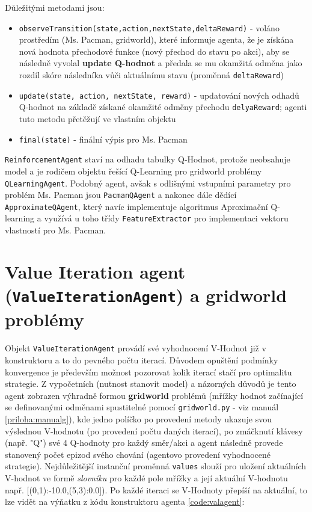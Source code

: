 Důležitými metodami jsou:
\begin{itemize}
\item \texttt{observeTransition(state,action,nextState,deltaReward)} - voláno prostředím (Ms. Pacman, gridworld), které informuje agenta, že je získána nová hodnota přechodové funkce (nový přechod do stavu po akci), aby se následně vyvolal \textbf{update Q-hodnot} a předala se mu okamžitá odměna jako rozdíl skóre následníka vůči aktuálnímu stavu (proměnná \texttt{deltaReward})
\item \texttt{update(state, action, nextState, reward)} - updatování nových odhadů Q-hodnot na základě získané okamžité odměny přechodu \texttt{delyaReward}; agenti tuto metodu přetěžují ve vlastním objektu
\item \texttt{final(state)} - finální výpis pro Ms. Pacman 
\end{itemize}
\texttt{ReinforcementAgent} staví na odhadu tabulky Q-Hodnot, protože neobsahuje model a je rodičem objektu řešící Q-Learning pro gridworld problémy \texttt{QLearningAgent}. Podobný agent, avšak s odlišnými vstupními parametry pro problém Ms. Pacman jsou \texttt{PacmanQAgent} a nakonec dále dědící \texttt{ApproximateQAgent}, který navíc implementuje algoritmus Aproximační Q-learning a využívá u toho třídy \texttt{FeatureExtractor} pro implementaci vektoru vlastností pro Ms. Pacman.
\newpage

\section{Value Iteration agent (\texttt{ValueIterationAgent}) a gridworld problémy}
Objekt \texttt{ValueIterationAgent} provádí své vyhodnocení V-Hodnot již v konstruktoru a to do pevného počtu iterací. Důvodem opuštění podmínky konvergence je především možnost pozorovat kolik iterací stačí pro optimalitu strategie. Z vypočetních (nutnost stanovit model) a názorných důvodů je tento agent zobrazen výhradně formou \textbf{gridworld} problémů (mřížky hodnot začínající se definovanými odměnami spustitelné pomocí \texttt{gridworld.py} - viz manuál \ref{priloha:manualg}), kde jedno políčko po provedení metody ukazuje svou výslednou V-hodnotu (po provedení počtu daných iterací), po zmáčknutí klávesy (např. "Q") své 4 Q-hodnoty pro každý směr/akci a agent následně provede stanovený počet epizod svého chování (agentovo provedení vyhodnocené strategie). Nejdůležitější instanční proměnná \texttt{values} slouží pro uložení aktuálních V-hodnot ve formě \textit{slovníku} pro každé pole mřížky a její aktuální V-hodnotu např. [(0,1):-10.0,(5,3):0.0]). Po každé iteraci se V-Hodnoty přepíší na aktuální, to lze vidět na výňatku z kódu konstruktoru agenta \ref{code:valagent}:

